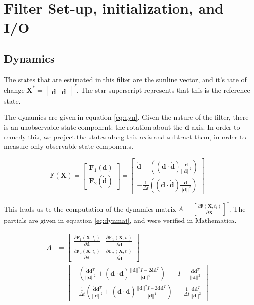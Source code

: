 \documentclass[]{BasiliskReportMemo}
\begin{document}
\section{Filter Set-up, initialization, and I/O}

\subsection{Dynamics}

The states that are estimated in this filter are the sunline vector, and it's rate of change $\bm X^* = \begin{bmatrix} \bm d &  \dot{\bm d}\end{bmatrix}^T$. The star superscript represents that
this is the reference state. 

The dynamics are given in equation \ref{eq:dyn}. Given the nature of the filter, there is an unobservable state component: the rotation about the $\bm d$ axis. In order to remedy this, we project the states along this axis and subtract them, in order to measure only observable state components. 

\begin{equation}\label{eq:dyn}
\bm F(\bm X) = \begin{bmatrix} \bm F_1(\bm d) \\  \bm F_2(\dot{\bm d})\end{bmatrix} =  \begin{bmatrix} \dot{\bm d} - \left( (\bm d \cdot \dot{\bm d} )\frac{\bm d}{||\bm d||^2} \right) \\ - \frac{1}{\Delta t}\left( (\bm d \cdot \dot{\bm d}) \frac{\bm d}{||\bm d||^2} \right)\end{bmatrix} 
\end{equation}

This leads us to the computation of the dynamics matrix $A = \left[\frac{\partial \bm F (\bm X, t_i)}{\partial \bm X}\right]^{*}$. The partials are given in equation \ref{eq:dynmat}, and were verified in Mathematica.

\begin{align}\label{eq:dynmat}
A&= \begin{bmatrix} \frac{\partial \bm F_1 (\bm X, t_i)}{\partial \bm d} &  \frac{\partial \bm F_1 (\bm X, t_i)}{\partial \dot{\bm d}} \\  \frac{\partial \bm F_2 (\bm X, t_i)}{\partial \bm d} &  \frac{\partial \bm F_2 (\bm X, t_i)}{\partial \dot{\bm d}}\end{bmatrix} \\
&=  \begin{bmatrix}- \left( \frac{\dot{\bm d} \bm d^T}{||\bm d||^2} + (\bm d \cdot \dot{\bm d})\frac{||\bm d||^2 I - 2 \bm d \bm d^T}{||\bm d||^4} \right) & I -\frac{\bm d \bm d^T}{||\bm d||^2} \\ - \frac{1}{\Delta t}\left( \frac{\dot{\bm d} \bm d^T}{||\bm d||^2} + (\bm d \cdot \dot{\bm d})\frac{||\bm d||^2 I - 2 \bm d \bm d^T}{||\bm d||^4} \right) & -\frac{1}{\Delta t}\frac{\bm d \bm d^T}{||\bm d||^2}\end{bmatrix} 
\end{align}
\end{document}
